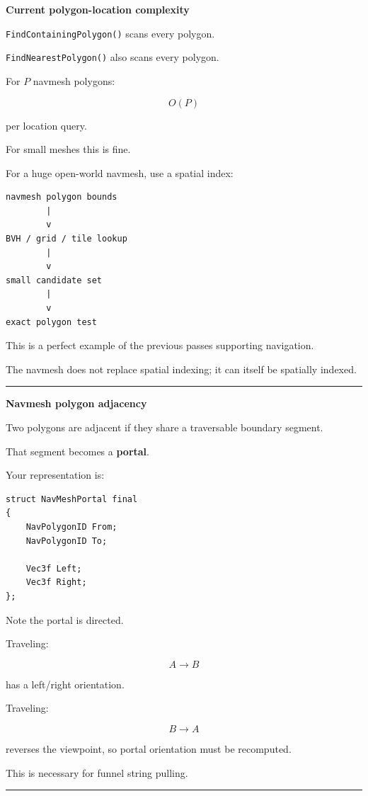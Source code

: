 \textbf{Current polygon-location complexity}

\texttt{FindContainingPolygon()} scans every polygon.

\texttt{FindNearestPolygon()} also scans every polygon.

For \(P\) navmesh polygons:

\[
O(P)
\]

per location query.

For small meshes this is fine.

For a huge open-world navmesh, use a spatial index:

\begin{verbatim}
navmesh polygon bounds
        |
        v
BVH / grid / tile lookup
        |
        v
small candidate set
        |
        v
exact polygon test
\end{verbatim}

This is a perfect example of the previous passes supporting navigation.

The navmesh does not replace spatial indexing; it can itself be spatially indexed.

\begin{center}\rule{0.5\linewidth}{0.5pt}\end{center}

\textbf{Navmesh polygon adjacency}

Two polygons are adjacent if they share a traversable boundary segment.

That segment becomes a \textbf{portal}.

Your representation is:

\begin{verbatim}
struct NavMeshPortal final
{
    NavPolygonID From;
    NavPolygonID To;

    Vec3f Left;
    Vec3f Right;
};
\end{verbatim}

Note the portal is directed.

Traveling:

\[
A\rightarrow B
\]

has a left/right orientation.

Traveling:

\[
B\rightarrow A
\]

reverses the viewpoint, so portal orientation must be recomputed.

This is necessary for funnel string pulling.

\begin{center}\rule{0.5\linewidth}{0.5pt}\end{center}

